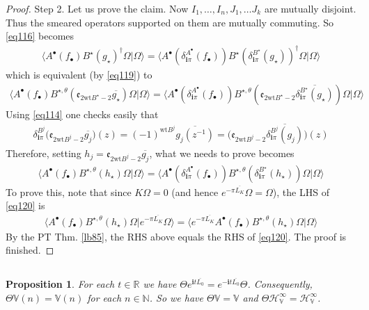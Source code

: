 \documentclass[12pt,b5paper,notitlepage]{article}
\theoremstyle{definition}
\theoremstyle{plain}
\newtheorem{pp}[df]{Proposition}
\newcommand{\ovl}{\overline}
\newcommand{\bk}[1]{\langle {#1}\rangle}
\newcommand{\im}{\mathbf{i}}
\newcommand{\blt}{\bullet}
\newcommand{\Vbb}{\mathbb V}
\newcommand{\Nbb}{\mathbb N}
\newcommand{\Rbb}{\mathbb R}
\newcommand{\wt}{\mathrm{wt}}
\newcommand{\HV}{\mathcal H_{\mathbb V}}
\newcommand{\ek}{\mathfrak{e}}
\numberwithin{equation}{section}
\begin{document}
\begin{proof}
Step 2. Let us prove the claim. Now $I_1,\dots,I_n,J_1,\dots J_k$ are mutually disjoint. Thus the smeared operators supported on them are mutually commuting. So \eqref{eq116} becomes
\begin{align*}
\bk{A^\blt(f_\blt)B^\star(g_\star)^\dagger\Omega|\Omega}=\bk{A^\blt(\delta_{\im\pi}^{A^\blt}(f_\blt))B^\star(\delta^{B^\star}_{\im\pi}(g_\star))^\dagger\Omega|\Omega}
\end{align*}
which is equivalent (by \eqref{eq119}) to
\begin{align*}
\bk{A^\blt(f_\blt)B^{\star,\theta}(\ek_{2\wt B^\star-2} \ovl{g_\star})\Omega|\Omega}=\bk{A^\blt(\delta_{\im\pi}^{A^\blt}(f_\blt))B^{\star,\theta}(\ek_{2\wt B^\star-2}\ovl{\delta^{B^\star}_{\im\pi}(g_\star)})\Omega|\Omega}
\end{align*}
Using \eqref{eq114} one checks easily that
\begin{align*}
\delta^{B^j}_{\im\pi}\big(\ek_{2\wt B^j-2} \ovl{g_j}\big)(z)=(-1)^{\wt B^j}\ovl {g_j(z^{-1})}=\big(\ek_{2\wt B^j-2}\ovl{\delta^{B^j}_{\im\pi}(g_j)}\big)(z)
\end{align*}
Therefore, setting $h_j=\ek_{2\wt B^j-2} \ovl{g_j}$, what we needs to prove becomes
\begin{align*}
\bk{A^\blt(f_\blt)B^{\star,\theta}(h_\star)\Omega|\Omega}=\bk{A^\blt(\delta_{\im\pi}^{A^\blt}(f_\blt))B^{\star,\theta}(\delta_{\im\pi}^{B^\star}(h_\star))\Omega|\Omega}   \tag{$\heartsuit$}\label{eq120}
\end{align*}
To prove this, note that since $K\Omega=0$ (and hence $e^{-\pi \ovl{L_K}}\Omega=\Omega$), the LHS of \eqref{eq120} is
\begin{align*}
\bk{A^\blt(f_\blt)B^{\star,\theta}(h_\star)\Omega|e^{-\pi \ovl{L_K}}\Omega}=\bk{e^{-\pi \ovl{L_K}}A^\blt(f_\blt)B^{\star,\theta}(h_\star)\Omega|\Omega}
\end{align*}
By the PT Thm. \ref{lb85}, the RHS above equals the RHS of \eqref{eq120}. The proof is finished.
\end{proof}


\subsection{}


\begin{pp}\label{lb87}
For each $t\in\Rbb$ we have $\Theta e^{\im t\ovl{L_0}}=e^{-\im t\ovl{L_0}}\Theta$. Consequently, $\Theta\Vbb(n)=\Vbb(n)$ for each $n\in\Nbb$. So we have $\Theta\Vbb=\Vbb$ and $\Theta\HV^\infty=\HV^\infty$.
\end{pp}
\end{document}
